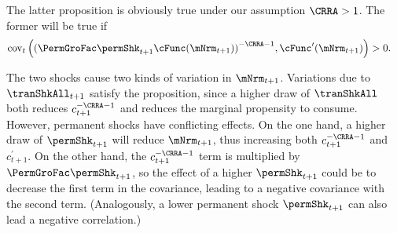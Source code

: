 \documentclass[\econtexRoot/BufferStockTheory]{subfiles}
\begin{document}
The latter proposition is obviously true under our assumption $\CRRA > 1$.
The former will be true if
\begin{align*}
  \mbox{cov}_{t}\left({(\PermGroFac \permShk_{t+1} \cFunc(\mNrm_{t+1}))}^{-\CRRA-1},\cFunc^{\prime}(\mNrm_{t+1}) \right)  & > 0 \nonumber.
\end{align*}

The two shocks cause two kinds of variation in $\mNrm_{t+1}$.
Variations due to $\tranShkAll_{t+1}$ satisfy the proposition, since a higher draw of $\tranShkAll$ both reduces $c_{t+1}^{-\CRRA-1}$ and reduces the marginal propensity to consume.
However, permanent shocks have conflicting effects.
On the one hand, a higher draw of $\permShk_{t+1}$ will reduce $\mNrm_{t+1}$, thus increasing both $c_{t+1}^{-\CRRA-1}$ and $c_{t+1}^{\prime}$.
On the other hand, the $c_{t+1}^{-\CRRA-1}$ term is multiplied by $\PermGroFac \permShk_{t+1}$, so the effect of a higher $\permShk_{t+1}$ could be to decrease the first term in the covariance, leading to a negative covariance with the second term.
(Analogously, a lower permanent shock $\permShk_{t+1}$ can also lead a negative correlation.)
\end{document}
